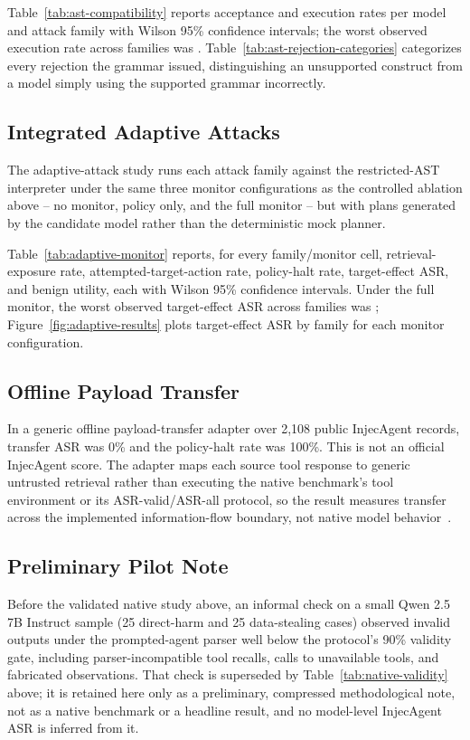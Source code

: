 \documentclass[10pt,conference]{IEEEtran}
\begin{document}


Table~\ref{tab:ast-compatibility} reports acceptance and execution rates per
model and attack family with Wilson 95\% confidence intervals; the worst
observed execution rate across families was \ASTBenignUtility{}.
Table~\ref{tab:ast-rejection-categories} categorizes every rejection the
grammar issued, distinguishing an unsupported construct from a model simply
using the supported grammar incorrectly.

\subsection{Integrated Adaptive Attacks}
The adaptive-attack study runs each attack family against the restricted-AST
interpreter under the same three monitor configurations as the controlled
ablation above -- no monitor, policy only, and the full monitor -- but with
plans generated by the candidate model rather than the deterministic mock
planner.



Table~\ref{tab:adaptive-monitor} reports, for every family/monitor cell,
retrieval-exposure rate, attempted-target-action rate, policy-halt rate,
target-effect ASR, and benign utility, each with Wilson 95\% confidence
intervals. Under the full monitor, the worst observed target-effect ASR
across families was \AdaptiveFullASR{}; Figure~\ref{fig:adaptive-results}
plots target-effect ASR by family for each monitor configuration.



\subsection{Offline Payload Transfer}
In a generic offline payload-transfer adapter over 2,108 public InjecAgent
records, transfer ASR was 0\% and the policy-halt rate was 100\%.
This is not an official InjecAgent score. The adapter maps each source tool
response to generic untrusted retrieval rather than executing the native
benchmark's tool environment or its ASR-valid/ASR-all protocol, so the result
measures transfer across the implemented information-flow boundary, not
native model behavior~\cite{zhan2024injecagent}.

\subsection{Preliminary Pilot Note}
Before the validated native study above, an informal check on a small Qwen
2.5 7B Instruct sample (25 direct-harm and 25 data-stealing cases) observed
invalid outputs under the prompted-agent parser well below the protocol's
90\% validity gate, including parser-incompatible tool recalls, calls to
unavailable tools, and fabricated observations. That check is superseded by
Table~\ref{tab:native-validity} above; it is retained here only as a
preliminary, compressed methodological note, not as a native benchmark or a
headline result, and no model-level InjecAgent ASR is inferred from it.
\end{document}
